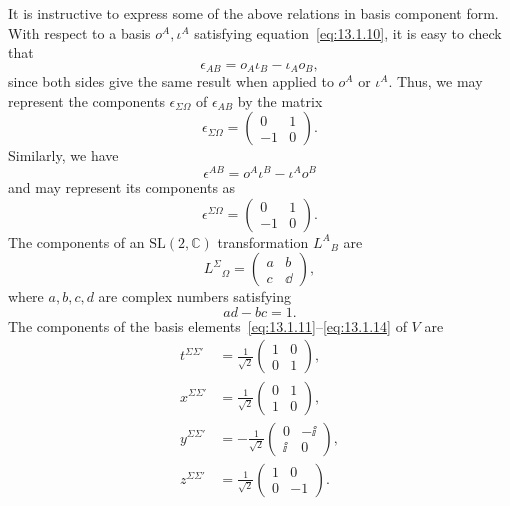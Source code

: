 It is instructive to express some of the above relations in basis component form.
With respect to a basis \(o^A,\iota^A\) satisfying equation~\eqref{eq:13.1.10}, it
is easy to check that
\begin{equation}
  \epsilon_{AB}=o_A\iota_B-\iota_Ao_B,
  \tag{13.1.19}\label{eq:13.1.19}
\end{equation}
since both sides give the same result when applied to \(o^A\) or \(\iota^A\). Thus,
we may represent the components \(\epsilon_{\Sigma\Omega}\) of
\(\epsilon_{AB}\) by the matrix
\begin{equation}
  \epsilon_{\Sigma\Omega}=
  \begin{pmatrix}0&1\\-1&0\end{pmatrix}.
  \tag{13.1.20}\label{eq:13.1.20}
\end{equation}
Similarly, we have
\begin{equation}
  \epsilon^{AB}=o^A\iota^B-\iota^Ao^B
  \tag{13.1.21}\label{eq:13.1.21}
\end{equation}
and may represent its components as
\begin{equation}
  \epsilon^{\Sigma\Omega}=
  \begin{pmatrix}0&1\\-1&0\end{pmatrix}.
  \tag{13.1.22}\label{eq:13.1.22}
\end{equation}
The components of an \(\mathrm{SL}(2,\mathbb C)\) transformation \(L^A{}_B\) are
\begin{equation}
  L^\Sigma{}_\Omega=
  \begin{pmatrix}a&b\\c&\dd\end{pmatrix},
  \tag{13.1.23}\label{eq:13.1.23}
\end{equation}
where \(a,b,c,d\) are complex numbers satisfying
\begin{equation}
  ad-bc=1.
  \tag{13.1.24}\label{eq:13.1.24}
\end{equation}
The components of the basis elements~\eqref{eq:13.1.11}--\eqref{eq:13.1.14} of
\(V\) are
\begin{align}
  t^{\Sigma\Sigma'}&=\frac1{\sqrt2}
  \begin{pmatrix}1&0\\0&1\end{pmatrix},
  \tag{13.1.25}\label{eq:13.1.25}\\
  x^{\Sigma\Sigma'}&=\frac1{\sqrt2}
  \begin{pmatrix}0&1\\1&0\end{pmatrix},
  \tag{13.1.26}\label{eq:13.1.26}\\
  y^{\Sigma\Sigma'}&=-\frac1{\sqrt2}
  \begin{pmatrix}0&-\ii\\\ii&0\end{pmatrix},
  \tag{13.1.27}\label{eq:13.1.27}\\
  z^{\Sigma\Sigma'}&=\frac1{\sqrt2}
  \begin{pmatrix}1&0\\0&-1\end{pmatrix}.
  \tag{13.1.28}\label{eq:13.1.28}
\end{align}
